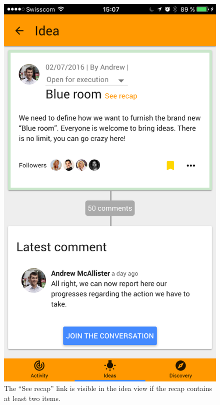 \documentclass[a4paper,12pt,twoside]{article}
\begin{document}
\begin{figure}[!htb]
    \begin{minipage}[t]{.48\textwidth}
        \centering
        \includegraphics[width=.67\textwidth]{images/flow_recap_1.png}
        \caption{The “See recap” link is visible in the idea view if the recap contains at least two items.}
    \end{minipage}
    \hfill
    \begin{minipage}[t]{.48\textwidth}
        \centering

\end{minipage}
\end{figure}
\end{document}
